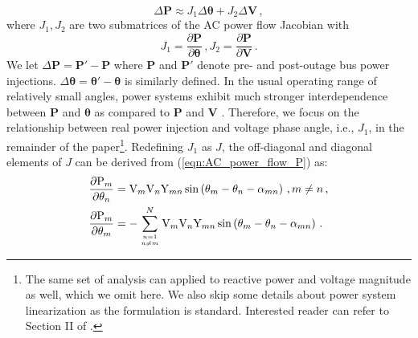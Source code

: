 \begin{equation}
\label{eqn:ac_decoupled_jacobian}
\Delta \textbf{P} \approx J_1 \Delta\boldsymbol{\theta} + J_2 \Delta\textbf{V}\,,
\end{equation}
where ${J}_1, {J}_2$ are two submatrices of the AC power flow Jacobian with 
\begin{equation}
\label{eqn:ac_jacobian}
{J}_1 = \frac{\partial \textbf{P}}{\partial \boldsymbol{\theta}} \,, 
{J}_2 = \frac{\partial \textbf{P}}{\partial \textbf{V}} \,.
\end{equation}
We let $\Delta \textbf{P} = \textbf{P}' - \textbf{P}$ where $\textbf{P}$ and $\textbf{P}'$ denote pre- and post-outage bus power injections. $\Delta\boldsymbol{\theta} = \boldsymbol{\theta}' - \boldsymbol{\theta}$ is similarly defined. In the usual operating range of relatively small angles, power systems exhibit much stronger interdependence between \textbf{P} and $\boldsymbol{\theta}$ as compared to \textbf{P} and \textbf{V} \cite{murty2017power}. Therefore, we focus on the relationship between real power injection and voltage phase angle, i.e., ${J}_1$, in the remainder of the paper\footnote{The same set of analysis can applied to reactive power and voltage magnitude as well, which we omit here. We also skip some details about power system linearization as the formulation is standard. Interested reader can refer to Section II of \cite{yang2020control}.}. Redefining ${J}_1$ as ${J}$, the off-diagonal and diagonal elements of ${J}$ can be derived from (\ref{eqn:AC_power_flow_P}) as:
\begin{subequations}
\label{eqn:elements_J}
\begin{align}
    \frac{\partial \text{P}_{m}}{\partial \theta_{n}} 
    & = \text{V}_{m} \text{V}_{n} \text{Y}_{m n} \sin \left( \theta_{m} - \theta_{n} - \alpha_{m n} \right) \,,  m \neq n \,,\label{eqn:elements_J_off}\\ 
    \frac{\partial \text{P}_{m}}{\partial \theta_{m}} 
    & = -\sum_{ n=1 \atop n \neq m}^{N} \text{V}_{m} \text{V}_{n} \text{Y}_{m n} \sin \left( \theta_{m} - \theta_{n} - \alpha_{m n} \right) \,. \label{eqn:elements_J_diag} 
\end{align}
\end{subequations}

